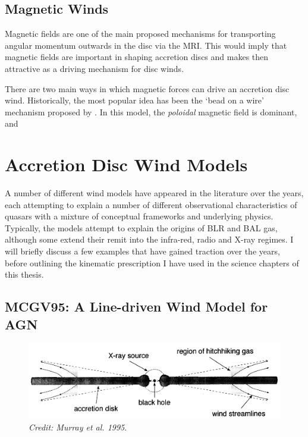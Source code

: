 \subsection{Magnetic Winds}
\label{sec:mag_winds}

Magnetic fields are one of the main proposed mechanisms for transporting
angular momentum outwards in the disc via the MRI. This would imply
that magnetic fields are important in shaping accretion discs and makes
then attractive as a driving mechanism for disc winds.

There are two main ways in which magnetic forces can drive an 
accretion disc wind. Historically, the most popular idea has been the `bead on a wire' mechanism proposed by \citep{blandfordpayne}. In this model,
the {\em poloidal} magnetic field is dominant, and 

\section{Accretion Disc Wind Models}
\label{sec:wind_models}

A number of different wind models have appeared in the literature over the 
years, each attempting to explain a number of different observational characteristics
of quasars with a mixture of conceptual frameworks and underlying physics. 
Typically, the models attempt to explain the origins of BLR and BAL gas, although
some extend their remit into the infra-red, radio and X-ray regimes.
I will briefly discuss a few examples that have gained traction over the years,
before outlining the kinematic prescription I have used in the science chapters
of this thesis. 

\subsection{MCGV95: A Line-driven Wind Model for AGN}

\begin{figure}
\centering
\includegraphics[width=1.0\textwidth]{figures/02-outflows/MCGV95.png}
\caption
{
{\sl Credit: Murray et al. 1995}. 
} 
\label{fig:MCGV95}
\end{figure}




